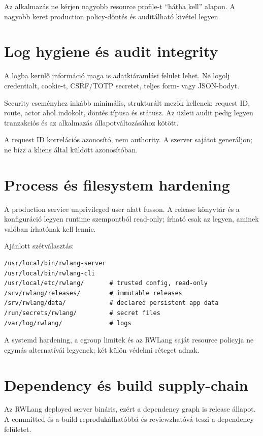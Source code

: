 Az alkalmazás ne kérjen nagyobb resource profile-t ``hátha kell'' alapon. A nagyobb keret production policy-döntés és auditálható kivétel legyen.

\section{Log hygiene és audit integrity}

A logba kerülő információ maga is adatkiáramlási felület lehet. Ne logolj credentialt, cookie-t, CSRF/TOTP secretet, teljes form- vagy JSON-bodyt.

Security eseményhez inkább minimális, strukturált mezők kellenek: request ID, route, actor ahol indokolt, döntés típusa és státusz. Az üzleti audit pedig legyen tranzakciós és az alkalmazás állapotváltozásához kötött.

A request ID korrelációs azonosító, nem authority. A szerver sajátot generáljon; ne bízz a kliens által küldött azonosítóban.

\section{Process és filesystem hardening}

A production service unprivileged user alatt fusson. A release könyvtár és a konfiguráció legyen runtime szempontból read-only; írható csak az legyen, aminek valóban írhatónak kell lennie.

Ajánlott szétválasztás:

\begin{lstlisting}
/usr/local/bin/rwlang-server
/usr/local/bin/rwlang-cli
/usr/local/etc/rwlang/       # trusted config, read-only
/srv/rwlang/releases/        # immutable releases
/srv/rwlang/data/            # declared persistent app data
/run/secrets/rwlang/         # secret files
/var/log/rwlang/             # logs
\end{lstlisting}

A systemd hardening, a cgroup limitek és az RWLang saját resource policyja ne egymás alternatívái legyenek; két külön védelmi réteget adnak.

\section{Dependency és build supply-chain}

Az RWLang deployed server bináris, ezért a dependency graph is release állapot. A committed  és a  build reprodukálhatóbbá és reviewzhatóvá teszi a dependency felületet.

